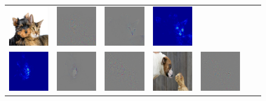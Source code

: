 \begin{figure}
\begin{center}
\begin{tabular}{ccccccc}
\includegraphics[width=0.13\linewidth]{figs/examples/googlenet/oxford/dog-cat3} &
\includegraphics[width=0.13\linewidth]{figs/examples/googlenet/oxford/dog-cat3_diff_286} &
\includegraphics[width=0.13\linewidth]{figs/examples/googlenet/soft/dog-cat3_diff_286} &
\includegraphics[width=0.13\linewidth]{figs/examples/googlenet/soft/dog-cat3_sali_286} \\
\includegraphics[width=0.13\linewidth]{figs/examples/googlenet/soft/dog-cat4_sali_243} &
\includegraphics[width=0.13\linewidth]{figs/examples/googlenet/soft/dog-cat4_diff_243} &
\includegraphics[width=0.13\linewidth]{figs/examples/googlenet/oxford/dog-cat4_diff_243} &
\includegraphics[width=0.13\linewidth]{figs/examples/googlenet/oxford/dog-cat4} &
\includegraphics[width=0.13\linewidth]{figs/examples/googlenet/oxford/dog-cat4_diff_286} &

\end{tabular}
\end{center}
\end{figure}
